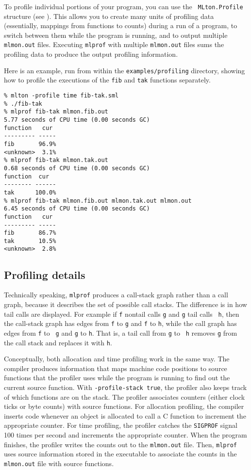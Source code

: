 To profile individual portions of your program, you can use the {\tt
MLton.Profile} structure (see ).  This
allows you to create many units of profiling data (essentially,
mappings from functions to counts) during a run of a program, to
switch between them while the program is running, and to output
multiple {\tt mlmon.out} files.  Executing {\tt mlprof} with multiple
{\tt mlmon.out} files sums the profiling data to produce the output
profiling information.

Here is an example, run from within the {\tt examples/profiling}
directory, showing how to profile the executions of the {\tt fib} and
{\tt tak} functions separately.

\begin{verbatim}
% mlton -profile time fib-tak.sml
% ./fib-tak
% mlprof fib-tak mlmon.fib.out
5.77 seconds of CPU time (0.00 seconds GC)
function   cur 
--------- -----
fib       96.9%
<unknown>  3.1%
% mlprof fib-tak mlmon.tak.out
0.68 seconds of CPU time (0.00 seconds GC)
function  cur  
-------- ------
tak      100.0%
% mlprof fib-tak mlmon.fib.out mlmon.tak.out mlmon.out
6.45 seconds of CPU time (0.00 seconds GC)
function   cur 
--------- -----
fib       86.7%
tak       10.5%
<unknown>  2.8%
\end{verbatim}
%
\subsection{Profiling details}

Technically speaking, {\tt mlprof} produces a call-stack graph rather
than a call graph, because it describes the set of possible call
stacks.  The difference is in how tail calls are displayed.  For
example if {\tt f} nontail calls {\tt g} and {\tt g} tail calls {\tt
h}, then the call-stack graph has edges from {\tt f} to {\tt g} and
{\tt f} to {\tt h}, while the call graph has edges from {\tt f} to {\tt
g} and {\tt g} to {\tt h}.  That is, a tail call from {\tt g} to {\tt
h} removes {\tt g} from the call stack and replaces it with {\tt h}.

Conceptually, both allocation and time profiling work in the same way.
The compiler produces information that maps machine code positions to
source functions that the profiler uses while the program is running
to find out the current source function.  With {\tt -profile-stack
true}, the profiler also keeps track of which functions are on the
stack.  The profiler associates counters (either clock ticks or byte
counts) with source functions.  For allocation profiling, the compiler
inserts code whenever an object is allocated to call a C function to
increment the appropriate counter.  For time profiling, the profiler
catches the {\tt SIGPROF} signal 100 times per second and increments
the appropriate counter.  When the program finishes, the profiler
writes the counts out to the {\tt mlmon.out} file.  Then, {\tt mlprof}
uses source information stored in the executable to associate the
counts in the {\tt mlmon.out} file with source functions.

